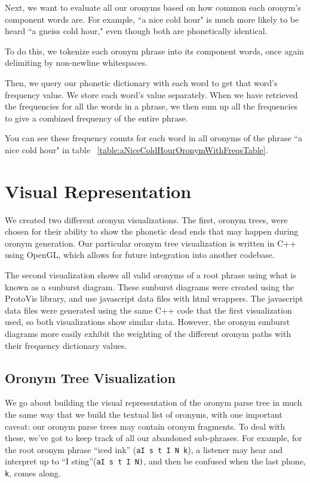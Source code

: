 Next, we want to evaluate all our oronyms based on how common each oronym's component words are.  For example, ``a nice cold hour" is much more likely to be heard ``a gneiss cold hour," even though both are phonetically identical.

To do this, we tokenize each oronym phrase into its component words, once again delimiting by non-newline whitespaces. 

Then, we query our phonetic dictionary with each word to get that word's frequency value.  We store each word's value separately. When we have retrieved the frequencies for all the words in a phrase, we then sum up all the frequencies  to give a combined frequency of the entire phrase.

You can see these frequency counts for each word in all oronyms of the phrase ``a nice cold hour" in table ~\ref{table:aNiceColdHourOronymWithFreqsTable}.




\section{Visual Representation}
\label{section:implementation:visualRepresentation}

We created two different oronym visualizations. The first, oronym trees, were chosen for their ability to show the phonetic dead ends that may happen during oronym generation. Our particular oronym tree visualization is written in C++ using OpenGL, which allows for future integration into another codebase. 

The second visualization shows all valid oronyms of a root phrase using what is known as a sunburst diagram. These sunburst diagrams were created using the ProtoVis library, and use javascript data files with html wrappers. The javascript data files were generated using the same C++ code that the first visualization used, so both visualizations show similar data.  However, the oronym sunburst diagrams more easily exhibit the weighting of the different oronym paths with their frequency dictionary values.


\subsection{Oronym Tree Visualization}
\label{subsection:oronymTreeVisualization}

We go about building the visual representation of the oronym parse tree in much the same way that we build the textual list of oronyms, with one important caveat: our oronym parse trees may contain oronym fragments.   To deal with these, we've got to keep track of all our abandoned sub-phrases. For example, for the root oronym phrase ``iced ink'' (\texttt{aI s t I N k}), a listener may hear and interpret up to ``I sting''(\texttt{aI s t I N)}, and then be confused when the last phone, \texttt{k}, comes along.

